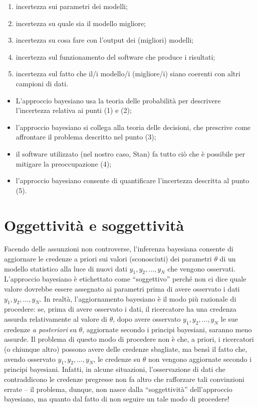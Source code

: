 \documentclass[
  11pt,
]{krantz}
\providecommand{\tightlist}{%
  \setlength{\itemsep}{0pt}\setlength{\parskip}{0pt}}
\theoremstyle{definition}
\theoremstyle{definition}
\theoremstyle{definition}
\theoremstyle{definition}
\theoremstyle{remark}
\begin{document}
\begin{enumerate}
\def\labelenumi{\arabic{enumi}.}
\tightlist
\item
  incertezza sui parametri dei modelli;
\item
  incertezza su quale sia il modello migliore;
\item
  incertezza su cosa fare con l'output dei (migliori) modelli;
\item
  incertezza sul funzionamento del software che produce i risultati;
\item
  incertezza sul fatto che il/i modello/i (migliore/i) siano coerenti con altri campioni di dati.
\end{enumerate}

\begin{itemize}
\tightlist
\item
  L'approccio bayesiano usa la teoria delle probabilità per descrivere l'incertezza relativa ai punti (1) e (2);
\item
  l'approccio bayesiano si collega alla teoria delle decisioni, che prescrive come affrontare il problema descritto nel punto (3);
\item
  il software utilizzato (nel nostro caso, Stan) fa tutto ciò che è possibile per mitigare la preoccupazione (4);
\item
  l'approccio bayesiano consente di quantificare l'incertezza descritta al punto (5).
\end{itemize}

\hypertarget{oggettivituxe0-e-soggettivituxe0}{%
\section{Oggettività e soggettività}\label{oggettivituxe0-e-soggettivituxe0}}

Facendo delle assunzioni non controverse, l'inferenza bayesiana consente di aggiornare le credenze a priori sui valori (sconosciuti) dei parametri \(\theta\) di un modello statistico alla luce di nuovi dati \(y_1, y_2, \dots, y_N\) che vengono osservati. L'approccio bayesiano è etichettato come ``soggettivo'' perché non ci dice quale valore dovrebbe essere assegnato ai parametri prima di avere osservato i dati \(y_1, y_2, \dots, y_N\). In realtà, l'aggiornamento bayesiano è il modo più razionale di procedere: se, prima di avere osservato i dati, il ricercatore ha una credenza assurda relativamente al valore di \(\theta\), dopo avere osservato \(y_1, y_2, \dots, y_N\) le sue credenze \emph{a posteriori} su \(\theta\), aggiornate secondo i principi bayesiani, saranno meno assurde. Il problema di questo modo di procedere non è che, a priori, i ricercatori (o chiunque altro) possono avere delle credenze sbagliate, ma bensì il fatto che, avendo osservato \(y_1, y_2, \dots, y_N\), le credenze su \(\theta\) non vengono aggiornate secondo i principi bayesiani. Infatti, in alcune situazioni, l'osservazione di dati che contraddicono le credenze pregresse non fa altro che rafforzare tali convinzioni errate -- il problema, dunque, non nasce dalla ``soggettività'' dell'approccio bayesiano, ma quanto dal fatto di non seguire un tale modo di procedere!
\end{document}
